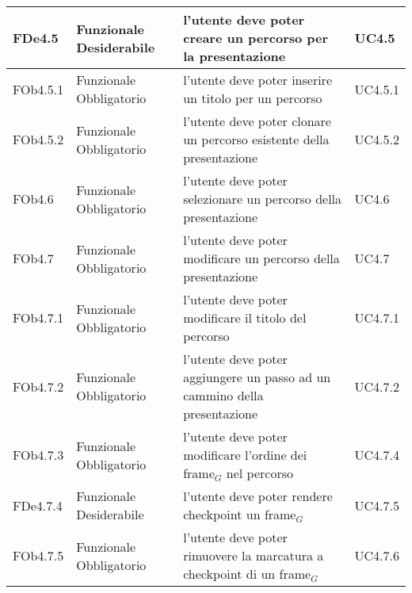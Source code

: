 \begin{longtable}{|l|p{2.5cm}|p{5cm}|p{3.5cm}|}
FDe4.5 & Funzionale \linebreak Desiderabile & l'utente deve poter creare un percorso per la presentazione & UC4.5 \linebreak  \\
\hline
FOb4.5.1 & Funzionale \linebreak Obbligatorio & l'utente deve poter inserire un titolo per un percorso & UC4.5.1 \linebreak  \\
\hline
FOb4.5.2 & Funzionale \linebreak Obbligatorio & l'utente deve poter clonare un percorso esistente della presentazione & UC4.5.2 \linebreak  \\
\hline
FOb4.6 & Funzionale \linebreak Obbligatorio & l'utente deve poter selezionare un percorso della presentazione & UC4.6 \linebreak  \\
\hline
FOb4.7 & Funzionale \linebreak Obbligatorio & l'utente deve poter modificare un percorso della presentazione & UC4.7 \linebreak  \\
\hline
FOb4.7.1 & Funzionale \linebreak Obbligatorio & l'utente deve poter modificare il titolo del percorso & UC4.7.1 \linebreak  \\
\hline
FOb4.7.2 & Funzionale \linebreak Obbligatorio & l'utente deve poter aggiungere un passo ad un cammino della presentazione & UC4.7.2 \linebreak  \\
\hline
FOb4.7.3 & Funzionale \linebreak Obbligatorio & l'utente deve poter modificare l'ordine dei frame$_G$ nel percorso & UC4.7.4 \linebreak  \\
\hline
FDe4.7.4 & Funzionale \linebreak Desiderabile & l'utente deve poter rendere checkpoint un frame$_G$ & UC4.7.5 \linebreak  \\
\hline
FOb4.7.5 & Funzionale \linebreak Obbligatorio & l'utente deve poter rimuovere la marcatura a checkpoint di un frame$_G$ & UC4.7.6 \linebreak  \\

\end{longtable}
